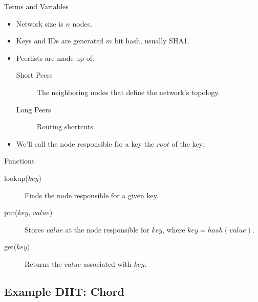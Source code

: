 \documentclass[11pt]{beamer}
\begin{document}
\begin{frame}{Terms and Variables}
	\begin{itemize}
		\item Network size is $n$ nodes.
		\item Keys and IDs are generated $m$ bit hash, usually SHA1.
		\item Peerlists are made up of:
		\begin{description}
			\item[Short Peers] The neighboring nodes that define the network's topology.
			\item[Long Peers] Routing shortcuts.
		\end{description}
		\item We'll call the node responsible for a key the $ root $ of the key.
	\end{itemize}
\end{frame}







\begin{frame}{Functions}
	\begin{description}
		\item[lookup($ key $)] Finds the node responsible for a given key.
		\item[put($ key $, $ value $)] Stores $value$ at the node responsible for $key$, where $key =  hash(value)$.
		\item[get($ key $)] Returns the $ value $ associated with $key$.
	\end{description}
\end{frame}






\subsection{Example DHT: Chord}
\end{document}
